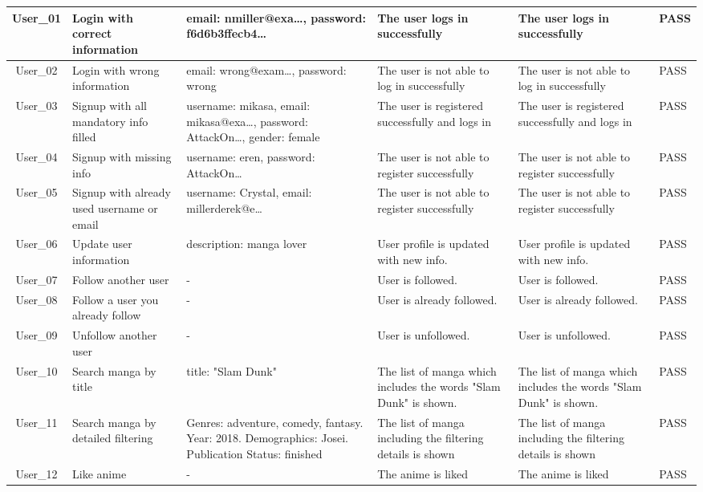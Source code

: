 \begin{longtable}{|c|>{\centering\arraybackslash}m{2cm}|>{\centering\arraybackslash}m{2.5cm}|>{\centering\arraybackslash}m{3cm}|>{\centering\arraybackslash}m{3cm}|>{\centering\arraybackslash}m{1.5cm}|}
    User\_01 & Login with correct information & email: nmiller@exa\ldots, password: f6d6b3ffecb4\ldots & The user logs in successfully & The user logs in successfully  & PASS \\
    \hline
    User\_02 & Login with wrong information  & email: wrong@exam\ldots, password: wrong  & The user is not able to log in successfully & The user is not able to log in successfully  & PASS  \\
    \hline
    User\_03  & Signup with all mandatory info filled & username: mikasa, email: mikasa@exa\ldots, password: AttackOn\ldots, gender: female  & The user is registered successfully and logs in  & The user is registered successfully and logs in  & PASS  \\
    \hline
    User\_04  & Signup with missing info & username: eren, password: AttackOn\ldots  & The user is not able to register successfully  & The user is not able to register successfully  & PASS  \\
    \hline
    User\_05 & Signup with already used username or email & username: Crystal, email: millerderek@e\ldots & The user is not able to register successfully & The user is not able to register successfully & PASS \\
    \hline
    User\_06 & Update user information & description: manga lover & User profile is updated with new info.  & User profile is updated with new info.  & PASS  \\
    \hline
    User\_07 & Follow another user & - & User is followed.  & User is followed.  & PASS  \\
    \hline
    User\_08 & Follow a user you already follow & - & User is already followed.  & User is already followed.  & PASS  \\
    \hline
    User\_09 & Unfollow another user & - & User is unfollowed. & User is unfollowed.  & PASS  \\
    \hline
    User\_10 & Search manga by title & title: "Slam Dunk"  & The list of manga which includes the words "Slam Dunk" is shown.  & The list of manga which includes the words "Slam Dunk" is shown. & PASS  \\
    \hline
    User\_11 & Search manga by detailed filtering & Genres: adventure, comedy, fantasy. Year: 2018. Demographics: Josei. Publication Status: finished  & The list of manga including the filtering details is shown  & The list of manga including the filtering details is shown  & PASS  \\
    \hline
    User\_12 & Like anime & - & The anime is liked & The anime is liked  & PASS \\

\end{longtable}
